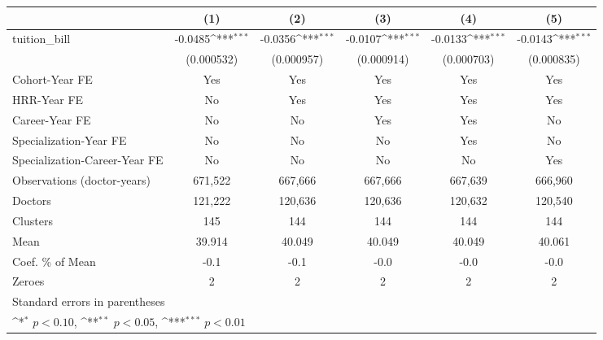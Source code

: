 {
\def\sym#1{\ifmmode^{#1}\else\(^{#1}\)\fi}
\begin{tabular}{l*{5}{c}}
\hline\hline
                    &\multicolumn{1}{c}{(1)}         &\multicolumn{1}{c}{(2)}         &\multicolumn{1}{c}{(3)}         &\multicolumn{1}{c}{(4)}         &\multicolumn{1}{c}{(5)}         \\
\hline
tuition\_bill        &     -0.0485\sym{***}&     -0.0356\sym{***}&     -0.0107\sym{***}&     -0.0133\sym{***}&     -0.0143\sym{***}\\
                    &  (0.000532)         &  (0.000957)         &  (0.000914)         &  (0.000703)         &  (0.000835)         \\
[1em]
Cohort-Year FE      &         Yes         &         Yes         &         Yes         &         Yes         &         Yes         \\
[1em]
HRR-Year FE         &          No         &         Yes         &         Yes         &         Yes         &         Yes         \\
[1em]
Career-Year FE      &          No         &          No         &         Yes         &         Yes         &          No         \\
[1em]
Specialization-Year FE&          No         &          No         &          No         &         Yes         &          No         \\
[1em]
Specialization-Career-Year FE&          No         &          No         &          No         &          No         &         Yes         \\
\hline
Observations (doctor-years)&     671,522         &     667,666         &     667,666         &     667,639         &     666,960         \\
Doctors             &     121,222         &     120,636         &     120,636         &     120,632         &     120,540         \\
Clusters            &         145         &         144         &         144         &         144         &         144         \\
Mean                &      39.914         &      40.049         &      40.049         &      40.049         &      40.061         \\
Coef. \% of Mean    &        -0.1         &        -0.1         &        -0.0         &        -0.0         &        -0.0         \\
Zeroes              &           2         &           2         &           2         &           2         &           2         \\
\hline\hline
\multicolumn{6}{l}{\footnotesize Standard errors in parentheses}\\
\multicolumn{6}{l}{\footnotesize \sym{*} \(p<0.10\), \sym{**} \(p<0.05\), \sym{***} \(p<0.01\)}\\
\end{tabular}
}
